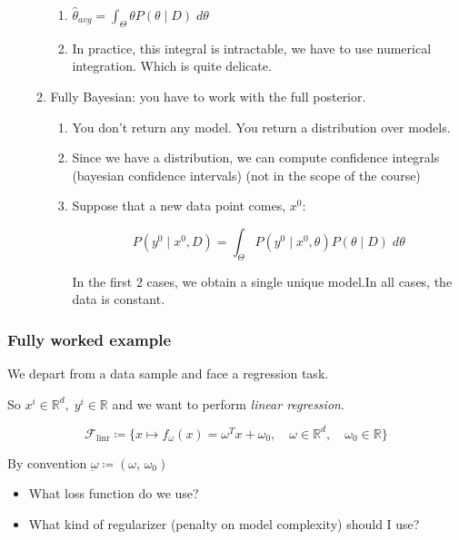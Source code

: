\begin{enumerate}
\begin{enumerate}
		            \begin{enumerate}
			            \item \(\hat{\theta}_{avg} = \int_\Theta \theta P(\theta \mid D) \; d\theta\)
			            \item In practice, this integral is intractable, we have to use
			                  numerical integration. Which is quite delicate.
		            \end{enumerate}
		      \item Fully Bayesian: you have to work with the full posterior.
		            \begin{enumerate}
			            \item You don't return any model. You return a distribution over models.
			            \item Since we have a distribution, we can compute confidence integrals
			                  (bayesian confidence intervals) (not in the scope of the course)
			            \item Suppose that a new data point comes, \(x^0\):

			                  \[P(y^0 \mid x^0, D) = \int_\Theta P(y^0 \mid x^0, \theta) P(\theta \mid D)\; d\theta
			                  \]

			                  In the first 2 cases, we obtain a single unique model.In all
			                  cases, the data is constant.
		            \end{enumerate}
	      \end{enumerate}
\end{enumerate}

\subsubsection{Fully worked example}

We depart from a data sample and face a regression task.

So \(x^i \in \mathds{R}^d,\; y^i \in \mathds{R}\) and we want to perform
\emph{linear regression}.

\begin{equation*}
	\mathcal{F}_{\text{linr}} \coloneqq \bigl\{
	x \mapsto f_\omega(x) = \omega^T x + \omega_0 ,\quad
	\omega \in \mathds{R}^d, \quad
	\omega_0 \in \mathds{R}
	\bigr\}
\end{equation*}

By convention \(\underbar{\omega} \coloneqq (\omega,\, \omega_0)\)

\begin{itemize}
	\item What loss function do we use?
	\item What kind of regularizer (penalty on model complexity) should I
	      use?
\end{itemize}

